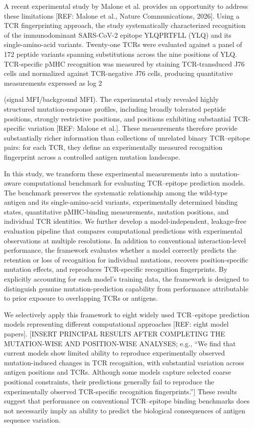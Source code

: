 A recent experimental study by Malone et al. provides an opportunity to address these limitations [REF: Malone et al., Nature Communications, 2026]. Using a TCR fingerprinting approach, the study systematically characterized recognition of the immunodominant SARS-CoV-2 epitope YLQPRTFLL (YLQ) and its single-amino-acid variants. Twenty-one TCRs were evaluated against a panel of 172 peptide variants spanning substitutions across the nine positions of YLQ. TCR-specific pMHC recognition was measured by staining TCR-transduced J76 cells and normalized against TCR-negative J76 cells, producing quantitative measurements expressed as log
2
	​

(signal MFI/background MFI). The experimental study revealed highly structured mutation-response profiles, including broadly tolerated peptide positions, strongly restrictive positions, and positions exhibiting substantial TCR-specific variation [REF: Malone et al.]. These measurements therefore provide substantially richer information than collections of unrelated binary TCR–epitope pairs: for each TCR, they define an experimentally measured recognition fingerprint across a controlled antigen mutation landscape.

In this study, we transform these experimental measurements into a mutation-aware computational benchmark for evaluating TCR–epitope prediction models. The benchmark preserves the systematic relationship among the wild-type antigen and its single-amino-acid variants, experimentally determined binding states, quantitative pMHC-binding measurements, mutation positions, and individual TCR identities. We further develop a model-independent, leakage-free evaluation pipeline that compares computational predictions with experimental observations at multiple resolutions. In addition to conventional interaction-level performance, the framework evaluates whether a model correctly predicts the retention or loss of recognition for individual mutations, recovers position-specific mutation effects, and reproduces TCR-specific recognition fingerprints. By explicitly accounting for each model's training data, the framework is designed to distinguish genuine mutation-prediction capability from performance attributable to prior exposure to overlapping TCRs or antigens.

We selectively apply this framework to eight widely used TCR–epitope prediction models representing different computational approaches [REF: eight model papers]. [INSERT PRINCIPAL RESULTS AFTER COMPLETING THE MUTATION-WISE AND POSITION-WISE ANALYSES; e.g., “We find that current models show limited ability to reproduce experimentally observed mutation-induced changes in TCR recognition, with substantial variation across antigen positions and TCRs. Although some models capture selected coarse positional constraints, their predictions generally fail to reproduce the experimentally observed TCR-specific recognition fingerprints.”] These results suggest that performance on conventional TCR–epitope binding benchmarks does not necessarily imply an ability to predict the biological consequences of antigen sequence variation.

